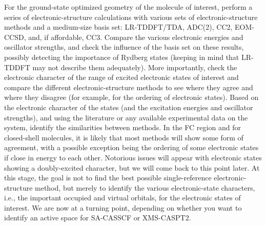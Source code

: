 \documentclass[9pt,bestpractices]{livecoms}
\begin{document}
For the ground-state optimized geometry of the molecule of interest, perform a series of electronic-structure calculations with various sets of electronic-structure methods and a medium-size basis set: LR-TDDFT/TDA, ADC(2), CC2, EOM-CCSD, and, if affordable, CC3. Compare the various electronic energies and oscillator strengths, and check the influence of the basis set on these results, possibly detecting the importance of Rydberg states (keeping in mind that LR-TDDFT may not describe them adequately). More importantly, check the electronic character of the range of excited electronic states of interest and compare the different electronic-structure methods to see where they agree and where they disagree (for example, for the ordering of electronic states). Based on the electronic character of the states (and the excitation energies and oscillator strengths), and using the literature or any available experimental data on the system, identify the similarities between methods. In the FC region and for closed-shell molecules, it is likely that most methods will show some form of agreement, with a possible exception being the ordering of some electronic states if close in energy to each other. Notorious issues will appear with electronic states showing a doubly-excited character, but we will come back to this point later. At this stage, the goal is not to find the best possible single-reference electronic-structure method, but merely to identify the various electronic-state characters, i.e., the important occupied and virtual orbitals, for the electronic states of interest. We are now at a turning point, depending on whether you want to identify an active space for SA-CASSCF  or XMS-CASPT2. 
\end{document}
